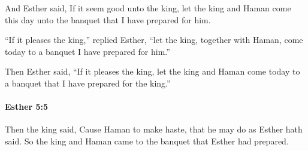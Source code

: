 			\begin{versebox}
					\item[BHS] 
					\item[LXX] 
					\item[ASV] And Esther said, If it seem good unto the king, let the king and Haman come this day unto the banquet that I have prepared for him.
					\item[NIV] “If it pleases the king,” replied Esther, “let the king, together with Haman, come today to a banquet I have prepared for him.”
					\item[NRSV] Then Esther said, “If it pleases the king, let the king and Haman come today to a banquet that I have prepared for the king.”
			\end{versebox}

		\paragraph{Esther 5:5} %
			\label{ESTHER-5-5}

			Then the king said, Cause Haman to make haste, that he may do as Esther hath said. So the king and Haman came to the banquet that Esther had prepared.

